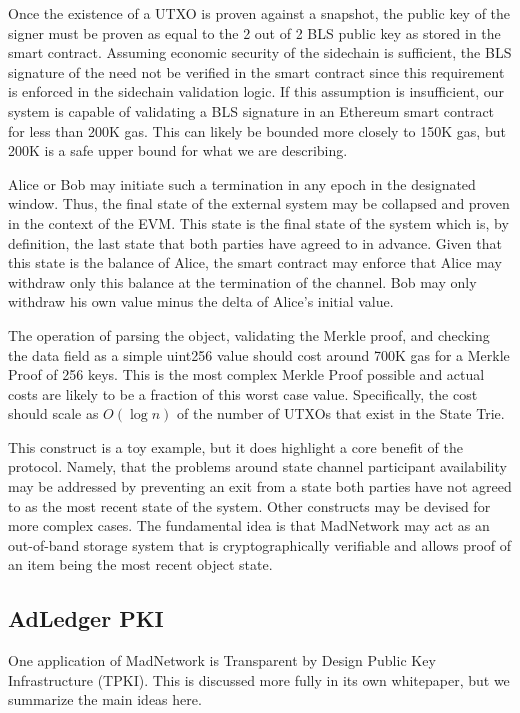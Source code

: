 Once the existence of a UTXO is proven against a snapshot, the public
key of the signer must be proven as equal to the 2 out of 2 BLS public
key as stored in the smart contract.
Assuming economic security of the sidechain is sufficient, the BLS
signature of the \DataStore{} need not be verified in the smart contract
since this requirement is enforced in the sidechain validation logic.
If this assumption is insufficient, our system is capable of validating
a BLS signature in an Ethereum smart contract for less than 200K gas.
This can likely be bounded more closely to 150K gas, but 200K is a safe
upper bound for what we are describing.

Alice or Bob may initiate such a termination in any epoch in the
designated window.
Thus, the final state of the external system may be collapsed and
proven in the context of the EVM.
This state is the final state of the system which is, by definition,
the last state that both parties have agreed to in advance.
Given that this state is the balance of Alice, the smart contract may
enforce that Alice may withdraw only this balance at the termination of
the channel.
Bob may only withdraw his own value minus the delta of Alice’s initial
value.

The operation of parsing the object, validating the Merkle proof, and
checking the data field as a simple uint256 value should cost around
700K gas for a Merkle Proof of 256 keys.
This is the most complex Merkle Proof possible and actual costs are
likely to be a fraction of this worst case value.
Specifically, the cost should scale as $O(\log n)$ of the number of UTXOs
that exist in the State Trie.

This construct is a toy example, but it does highlight a core benefit
of the protocol.
Namely, that the problems around state channel participant availability
may be addressed by preventing an exit from a state both parties have
not agreed to as the most recent state of the system.
Other constructs may be devised for more complex cases.
The fundamental idea is that MadNetwork may act as an out-of-band
storage system that is cryptographically verifiable and allows proof of
an item being the most recent object state.

\subsection{AdLedger PKI}

One application of MadNetwork is Transparent by Design Public Key
Infrastructure (TPKI).
This is discussed more fully in its own whitepaper, but we summarize
the main ideas here.

